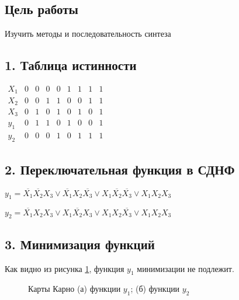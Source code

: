 \subsection*{Цель работы}

Изучить методы и последовательность синтеза

\subsection*{1. Таблица истинности}

$\begin{matrix}
    X_1 & 0 & 0 & 0 & 0 & 1 & 1 & 1 & 1\\
    X_2 & 0 & 0 & 1 & 1 & 0 & 0 & 1 & 1\\
    X_3 & 0 & 1 & 0 & 1 & 0 & 1 & 0 & 1\\
    y_1 & 0 & 1 & 1 & 0 & 1 & 0 & 0 & 1\\
    y_2 & 0 & 0 & 0 & 1 & 0 & 1 & 1 & 1
\end{matrix}$

\subsection*{2. Переключательная функция в СДНФ}

$y_1 = \overline{X_1} \overline{X_2} X_3 \lor \overline{X_1} X_2 \overline{X_3} \lor X_1 \overline{X_2} \overline{X_3} \lor X_1 X_2 X_3$

$y_2 = \overline{X_1} X_2 X_3 \lor X_1 \overline{X_2} X_3 \lor X_1 X_2 \overline{X_3} \lor X_1 X_2 X_3$

\subsection*{3. Минимизация функций}

Как видно из рисунка \ref{fig:karnaugh}, функция $y_1$ минимизации не подлежит.

\kvunitlength=13mm
\begin{figure}[ht]
    \qquad
    \caption{Карты Карно (а) функции $y_1$; (б) функции $y_2$}
    \label{fig:karnaugh}
\end{figure}

